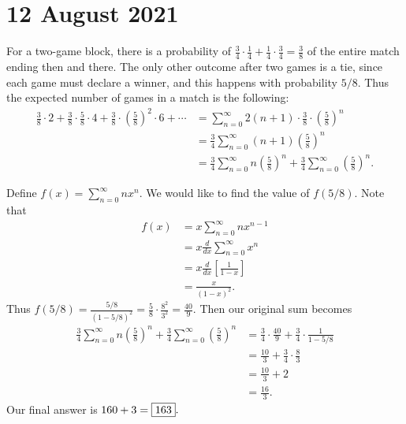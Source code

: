 \documentclass[letterpaper,oneside]{scrartcl}
\begin{document}
\section*{12 August 2021}
For a two-game block, there is a probability of $\displaystyle \frac34\cdot\frac14 + \frac14\cdot\frac34 = \frac38$ of the entire match ending then and there. The only other outcome after two games is a tie, since each game must declare a winner, and this happens with probability $5/8.$ Thus the expected number of games in a match is the following:
\begin{align*}
    \frac38\cdot2 + \frac38\cdot\frac58\cdot4+ \frac38\cdot\left(\frac58\right)^2\cdot6 + \cdots
     & = \sum_{n=0}^{\infty} 2(n+1)\cdot\frac38\cdot\left(\frac58\right)^n                                        \\
     & = \frac34 \sum_{n=0}^{\infty} (n+1)\left(\frac58\right)^n                                                  \\
     & = \frac34 \sum_{n=0}^{\infty} n\left(\frac58\right)^n + \frac34\sum_{n=0}^{\infty} \left(\frac58\right)^n.
\end{align*}

Define $f(x) = \sum_{n=0}^\infty nx^n.$ We would like to find the value of $f(5/8).$ Note that
\begin{align*}
    f(x) & = x\sum_{n=0}^{\infty} nx^{n-1}            \\
         & = x \frac{d}{dx}\sum_{n=0}^{\infty} x^n    \\
         & = x \frac{d}{dx}\left[\frac{1}{1-x}\right] \\
         & = \frac{x}{(1-x)^2}.
\end{align*}
Thus $\displaystyle f(5/8)= \frac{5/8}{(1-5/8)^2} = \frac58 \cdot \frac{8^2}{3^2} = \frac{40}{9}.$ Then our original sum becomes
\begin{align*}
    \frac34 \sum_{n=0}^{\infty} n\left(\frac58\right)^n + \frac34\sum_{n=0}^{\infty} \left(\frac58\right)^n & = \frac34\cdot\frac{40}{9}+\frac34\cdot\frac{1}{1-5/8} \\
                                                                                                            & = \frac{10}{3} + \frac{3}{4}\cdot\frac{8}{3}           \\
                                                                                                            & = \frac{10}{3} + 2                                     \\
                                                                                                            & = \frac{16}{3}.
\end{align*}
Our final answer is $160+3 = \fbox{163}.$
\end{document}
